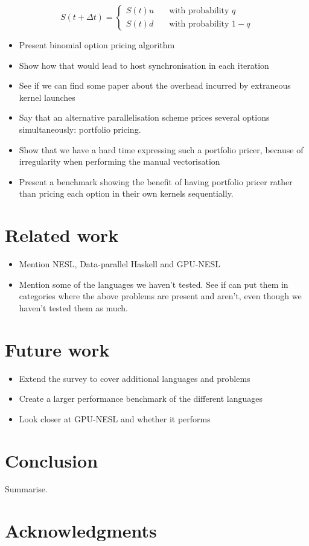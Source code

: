 \documentclass{llncs2e/llncs}
\begin{document}
\begin{equation}
S(t+\Delta t) = \left\{
  \begin{array}{ll}
    S(t)u & \quad \textrm{with probability $q$} \\
    S(t)d & \quad \textrm{with probability $1-q$}
  \end{array} \right.
\end{equation}


\begin{itemize}
\item Present binomial option pricing algorithm
\item Show how that would lead to host synchronisation in each iteration
\item See if we can find some paper about the overhead incurred by
  extraneous kernel launches
\item Say that an alternative parallelisation scheme prices several
  options simultaneously: portfolio pricing.
\item Show that we have a hard time expressing such a portfolio
  pricer, because of irregularity when performing the manual
  vectorisation
\item Present a benchmark showing the benefit of having portfolio
  pricer rather than pricing each option in their own kernels
  sequentially.
\end{itemize}

\section{Related work}
\begin{itemize}
\item Mention NESL, Data-parallel Haskell and GPU-NESL
\item Mention some of the languages we haven't tested. See if can put
  them in categories where the above problems are present and aren't,
  even though we haven't tested them as much.
\end{itemize}

\section{Future work}
\begin{itemize}
\item Extend the survey to cover additional languages and problems
\item Create a larger performance benchmark of the different languages
\item Look closer at GPU-NESL and whether it performs
\end{itemize}

\section{Conclusion}
Summarise.

\section{Acknowledgments}

 

\end{document}
